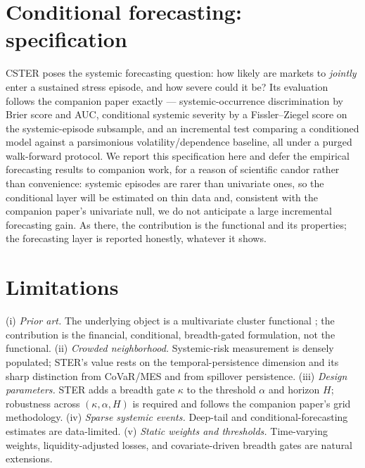 \documentclass[11pt]{article}
\begin{document}
\section{Conditional forecasting: specification}
CSTER poses the systemic forecasting question: how likely are markets to \emph{jointly} enter a sustained
stress episode, and how severe could it be? Its evaluation follows the companion paper exactly ---
systemic-occurrence discrimination by Brier score and AUC, conditional systemic severity by a
Fissler--Ziegel score on the systemic-episode subsample, and an incremental test comparing a conditioned
model against a parsimonious volatility/dependence baseline, all under a purged walk-forward protocol. We
report this specification here and defer the empirical forecasting results to companion work, for a reason
of scientific candor rather than convenience: systemic episodes are rarer than univariate ones, so the
conditional layer will be estimated on thin data and, consistent with the companion paper's univariate null,
we do not anticipate a large incremental forecasting gain. As there, the contribution is the functional and
its properties; the forecasting layer is reported honestly, whatever it shows.

\section{Limitations}
(i) \emph{Prior art.} The underlying object is a multivariate cluster functional \citep{basraksegers2009};
the contribution is the financial, conditional, breadth-gated formulation, not the functional. (ii)
\emph{Crowded neighborhood.} Systemic-risk measurement is densely populated; STER's value rests on the
temporal-persistence dimension and its sharp distinction from CoVaR/MES and from spillover persistence.
(iii) \emph{Design parameters.} STER adds a breadth gate $\kappa$ to the threshold $\alpha$ and horizon $H$;
robustness across $(\kappa,\alpha,H)$ is required and follows the companion paper's grid methodology. (iv)
\emph{Sparse systemic events.} Deep-tail and conditional-forecasting estimates are data-limited. (v)
\emph{Static weights and thresholds.} Time-varying weights, liquidity-adjusted losses, and covariate-driven
breadth gates are natural extensions.
\end{document}
